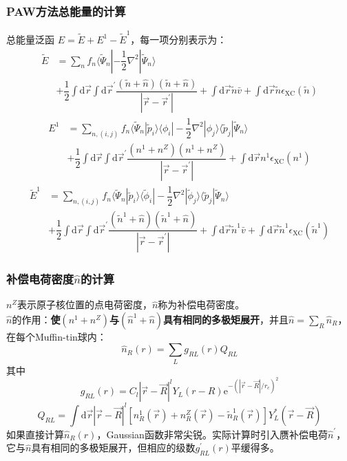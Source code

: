 \documentclass[cjk,slidestop,compress,mathserif,blue]{beamer}
\begin{document}
\frame
{
\frametitle{\textrm{PAW}方法总能量的计算}
总能量泛函
$E=\tilde E+E^1-\tilde E^1$，每一项分别表示为：
\begin{displaymath}
	\begin{aligned}
		\tilde E&=\sum_nf_n\langle\tilde\Psi_n|-\dfrac12\nabla^2|\tilde\Psi_n\rangle\\
		 &+\dfrac12\int\mathrm{d}\vec r\int\mathrm{d}\vec r^{\prime}\dfrac{(\tilde n+\hat n)(\tilde n+\hat n)}{|\vec r-\vec r^{\prime}|}+\int\mathrm{d}\vec r \tilde n\bar v+\int\mathrm{d}\vec r \tilde n\epsilon_{\mathrm{XC}}(\tilde n)
 	\end{aligned}
\end{displaymath}
\begin{displaymath}
	\begin{aligned}
		E^1&=\sum_{n,(i,j)}f_n\langle\tilde\Psi_n|\tilde p_i\rangle\langle\phi_i|-\dfrac12\nabla^2|\phi_j\rangle\langle\tilde p_j|\tilde\Psi_n\rangle\\
		 &+\dfrac12\int\mathrm{d}\vec r\int\mathrm{d}\vec r^{\prime}\dfrac{(n^1+n^Z)(n^1+n^Z)}{|\vec r-\vec r^{\prime}|}+\int\mathrm{d}\vec r n^1\epsilon_{\mathrm{XC}}(n^1)
 	\end{aligned}
\end{displaymath}
\begin{displaymath}
	\begin{aligned}
		\tilde E^1&=\sum_{n,(i,j)}f_n\langle\tilde\Psi_n|\tilde p_i\rangle\langle\tilde\phi_i|-\dfrac12\nabla^2|\tilde\phi_j\rangle\langle\tilde p_j|\tilde\Psi_n\rangle\\
		 &+\dfrac12\int\mathrm{d}\vec r\int\mathrm{d}\vec r^{\prime}\dfrac{(\tilde n^1+\hat n)(\tilde n^1+\hat n)}{|\vec r-\vec r^{\prime}|}+\int\mathrm{d}\vec r \tilde n^1\bar v+\int\mathrm{d}\vec r \tilde n^1\epsilon_{\mathrm{XC}}(\tilde n^1)
 	\end{aligned}
\end{displaymath}
}
\frame
{
	\frametitle{补偿电荷密度$\hat n$的计算}
$n^Z$表示原子核位置的点电荷密度，$\hat n$称为补偿电荷密度。\\
$\hat n$的作用：{\large\bf 使$(n^1+n^Z)$与$(\hat n^1+\hat n)$具有相同的多极矩展开}，并且$\hat n=\sum\nolimits_R\hat n_R$，在每个\textrm{Muffin-tin}球内：
$$\hat n_R(r)=\sum_Lg_{RL}(r)Q_{RL}$$
其中
$$g_{RL}(r)=C_l|\vec r-\vec R|^lY_L(r-R)\mathrm{e}^{-(|\vec r-\vec R|/r_c)^2}$$
$$Q_{RL}=\int\mathrm{d}\vec r|\vec r-\vec R|^l[n^1_R(\vec r)+n^Z_R(\vec r)-\tilde n^1_R(\vec r)]Y^{\ast}_L(\vec r-\vec R)$$
如果直接计算$\hat n_R(r)$，\textrm{Gaussian}函数非常尖锐。实际计算时引入赝补偿电荷$\hat n^{\prime}$，它与$\hat n$具有相同的多极矩展开，但相应的级数$g^{\prime}_{RL}(r)$平缓得多。
}
\end{document}
